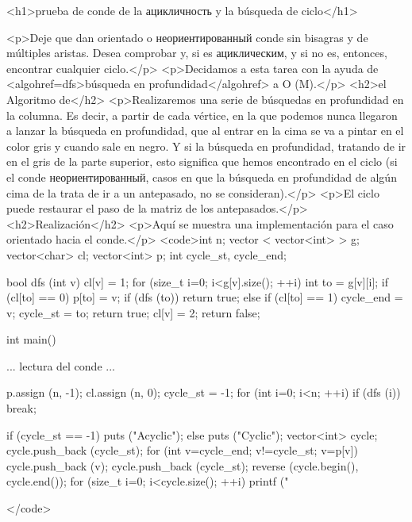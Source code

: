 <h1>prueba de conde de la ацикличность y la búsqueda de ciclo</h1>

<p>Deje que dan orientado o неориентированный conde sin bisagras y de múltiples aristas. Desea comprobar y, si es ациклическим, y si no es, entonces, encontrar cualquier ciclo.</p>
<p>Decidamos a esta tarea con la ayuda de <algohref=dfs>búsqueda en profundidad</algohref> a O (M).</p>
<h2>el Algoritmo de</h2>
<p>Realizaremos una serie de búsquedas en profundidad en la columna. Es decir, a partir de cada vértice, en la que podemos nunca llegaron a lanzar la búsqueda en profundidad, que al entrar en la cima se va a pintar en el color gris y cuando sale en negro. Y si la búsqueda en profundidad, tratando de ir en el gris de la parte superior, esto significa que hemos encontrado en el ciclo (si el conde неориентированный, casos en que la búsqueda en profundidad de algún cima de la trata de ir a un antepasado, no se consideran).</p>
<p>El ciclo puede restaurar el paso de la matriz de los antepasados.</p>
<h2>Realización</h2>
<p>Aquí se muestra una implementación para el caso orientado hacia el conde.</p>
<code>int n;
vector < vector<int> > g;
vector<char> cl;
vector<int> p;
int cycle_st, cycle_end;

bool dfs (int v) {
cl[v] = 1;
for (size_t i=0; i<g[v].size(); ++i) {
int to = g[v][i];
if (cl[to] == 0) {
p[to] = v;
if (dfs (to)) return true;
}
else if (cl[to] == 1) {
cycle_end = v;
cycle_st = to;
return true;
}
}
cl[v] = 2;
return false;
}

int main() {
... lectura del conde ...

p.assign (n, -1);
cl.assign (n, 0);
cycle_st = -1;
for (int i=0; i<n; ++i)
if (dfs (i))
break;

if (cycle_st == -1)
puts ("Acyclic");
else {
puts ("Cyclic");
vector<int> cycle;
cycle.push_back (cycle_st);
for (int v=cycle_end; v!=cycle_st; v=p[v])
cycle.push_back (v);
cycle.push_back (cycle_st);
reverse (cycle.begin(), cycle.end());
for (size_t i=0; i<cycle.size(); ++i)
printf ("%
}
}</code>